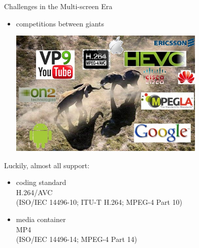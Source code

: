 \documentclass{beamer}
\begin{document}
\begin{frame}{Challenges in the Multi-screen Era} 
	\begin{itemize}
		\item<1> competitions between giants
		\begin{center}
		\includegraphics[height=6cm]{fig/competition.jpg}
		\end{center}
	\end{itemize}
\end{frame}

\begin{frame}{Luckily,}
	almost all support:
	\begin{itemize}
		\item<1> coding standard \\ 
		H.264/AVC\\
		(ISO/IEC 14496-10;  ITU-T H.264; MPEG-4 Part 10)
		\item<1> media container \\ 
		MP4\\
		(ISO/IEC 14496-14; MPEG-4 Part 14)
	\end{itemize}
	
\end{frame}
\end{document}
